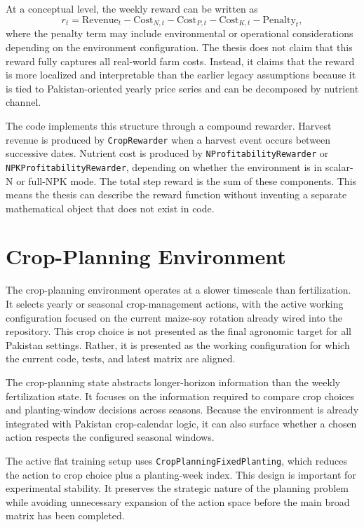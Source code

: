 At a conceptual level, the weekly reward can be written as
\begin{equation}
    r_t = \text{Revenue}_t - \text{Cost}_{N,t} - \text{Cost}_{P,t} - \text{Cost}_{K,t} - \text{Penalty}_t,
\end{equation}
where the penalty term may include environmental or operational considerations depending on the environment configuration. The thesis does not claim that this reward fully captures all real-world farm costs. Instead, it claims that the reward is more localized and interpretable than the earlier legacy assumptions because it is tied to Pakistan-oriented yearly price series and can be decomposed by nutrient channel.

The code implements this structure through a compound rewarder. Harvest revenue is produced by \texttt{CropRewarder} when a harvest event occurs between successive dates. Nutrient cost is produced by \texttt{NProfitabilityRewarder} or \texttt{NPKProfitabilityRewarder}, depending on whether the environment is in scalar-N or full-NPK mode. The total step reward is the sum of these components. This means the thesis can describe the reward function without inventing a separate mathematical object that does not exist in code.

\section{Crop-Planning Environment}

The crop-planning environment operates at a slower timescale than fertilization. It selects yearly or seasonal crop-management actions, with the active working configuration focused on the current maize-soy rotation already wired into the repository. This crop choice is not presented as the final agronomic target for all Pakistan settings. Rather, it is presented as the working configuration for which the current code, tests, and latest matrix are aligned.

The crop-planning state abstracts longer-horizon information than the weekly fertilization state. It focuses on the information required to compare crop choices and planting-window decisions across seasons. Because the environment is already integrated with Pakistan crop-calendar logic, it can also surface whether a chosen action respects the configured seasonal windows.

The active flat training setup uses \texttt{CropPlanningFixedPlanting}, which reduces the action to crop choice plus a planting-week index. This design is important for experimental stability. It preserves the strategic nature of the planning problem while avoiding unnecessary expansion of the action space before the main broad matrix has been completed.

